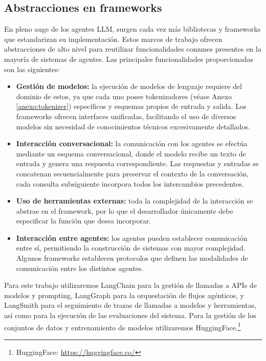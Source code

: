 


\subsection{Abstracciones en frameworks}
\label{sec:abst}
En pleno auge de los agentes LLM, surgen cada vez más bibliotecas y frameworks que estandarizan su implementación. Estos marcos de trabajo ofrecen abstracciones de alto nivel para reutilizar funcionalidades comunes presentes en la mayoría de sistemas de agentes.
Las principales funcionalidades proporcionadas son las siguientes: 
\begin{itemize}
\item {\textbf{Gestión de modelos:}} la ejecución de modelos de lenguaje requiere del dominio de estos, ya que cada uno posee tokenizadores (véase Anexo \ref{anexo:tokenizer}) específicos y esquemas propios de entrada y salida. Los frameworks ofrecen interfaces unificadas, facilitando el uso de diversos modelos sin necesidad de conocimientos técnicos excesivamente detallados.
\item {\textbf{Interacción conversacional:}} la comunicación con los agentes se efectúa mediante un esquema conversacional, donde el modelo recibe un texto de entrada y genera una respuesta correspondiente. Las respuestas y entradas se concatenan secuencialmente para preservar el contexto de la conversación, cada consulta subsiguiente incorpora todos los intercambios precedentes.
\item {\textbf{Uso de herramientas externas:}} toda la complejidad de la interacción se abstrae en el framework, por lo que el desarrollador únicamente debe especificar la función que desea incorporar.
\item {\textbf{Interacción entre agentes:}} los agentes pueden establecer comunicación entre sí, permitiendo la construcción de sistemas con mayor complejidad. Algunos frameworks establecen protocolos que definen las modalidades de comunicación entre los distintos agentes.
\end{itemize}

Para este trabajo utilizaremos LangChain para la gestión de llamadas a APIs de modelos y prompting, LangGraph para la orquestación de flujos agénticos, y LangSmith para el seguimiento de trazas de llamadas a modelos y herramientas, así como para la ejecución de las evaluaciones del sistema. Para la gestión de los conjuntos de datos y entrenamiento de modelos utilizaremos HuggingFace.\footnote{HuggingFace: \url{https://huggingface.co/}}

